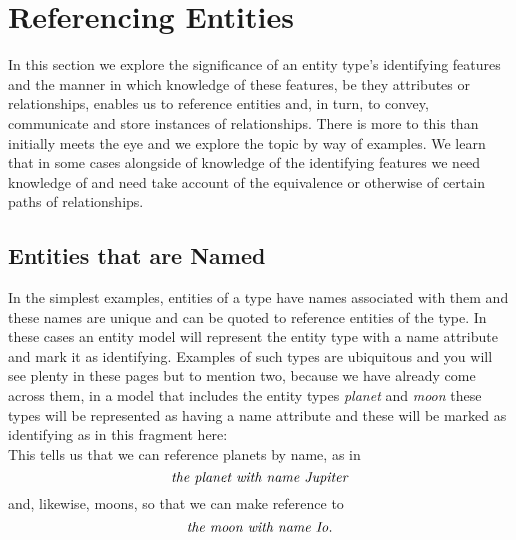 \section{Referencing Entities}
\label{ReferencingEntities}

In this section we explore the significance of an entity type's identifying features
and the manner in which knowledge of these features, 
be they attributes or relationships, enables us to 
reference entities and, in turn, 
to convey, communicate and store instances of relationships. 
There is more to this than initially meets the eye and we explore the topic
by way of examples.   We learn that in some cases alongside of knowledge of the identifying features we need knowledge of and need take account of the equivalence or otherwise of certain paths of relationships.

\subsection{Entities that are Named}
\mynote {}
In the simplest examples, entities of a type have names associated with them
 and these names are unique and can be  quoted to reference entities of the type. 
 In these cases an entity model will represent the entity type with a name attribute
and mark it as identifying. 
Examples of such types are ubiquitous and you will see plenty in these pages but to mention two, because we have already come across them, in a model that includes the 
entity types \textit{planet} and  \textit{moon}  these types will be represented as having 
a name attribute and these will be marked as identifying as in this fragment here:
\begin{equation}
\label{planetMoonModel}

\end{equation}
This tells us that we can reference planets by name, as in 
\begin{equation}
\label{theplanetJupiter}
\mbox{\textit{the planet with name Jupiter}}
\end{equation}
and, likewise, moons, so that we can make reference to 
\begin{equation}
\label{themoonIo}
\mbox{\textit{the moon with name Io}}.
\end{equation}

